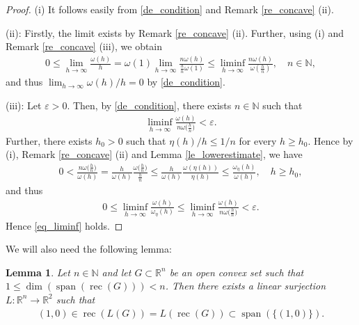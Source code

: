 \documentclass[10pt,a4paper]{amsart}
\newtheorem{lemma}[theorem]{Lemma}
\theoremstyle{definition}
\newcommand{\R}{\mathbb{R}}
\newcommand{\N}{\mathbb{N}}
\newcommand{\rec}{\operatorname{rec}}
\newcommand{\spann}{\operatorname{span}}
\begin{document}
\begin{proof}
(i) It follows easily from \eqref{de_condition} and Remark \ref{re_concave} (ii).

(ii): Firstly, the limit exists by Remark \ref{re_concave} (ii). Further, using (i) and Remark \ref{re_concave} (iii), we obtain
\begin{align*}
0\leq\lim_{h\to\infty}\frac{\omega(h)}{h}=\omega(1)\lim_{h\to\infty}\frac{n\omega(h)}{\frac{h}{n}\omega(1)}\leq\liminf_{h\to\infty}\frac{n\omega(h)}{\omega(\frac{h}{n})},\quad n\in\N,
\end{align*}
and thus $ \lim_{h\to\infty}\omega(h)/h=0 $ by \eqref{de_condition}.

(iii): Let $ \varepsilon>0 $. Then, by \eqref{de_condition}, there exists $ n\in\N $ such that
\begin{align*}
\liminf_{h\to\infty}\frac{\omega(h)}{n\omega\big(\frac{h}{n}\big)}<\varepsilon.
\end{align*}
Further, there exists $ h_0>0 $ such that $ \eta(h)/h\leq 1/n $ for every $ h\geq h_0 $. Hence by (i), Remark \ref{re_concave} (ii) and Lemma \ref{le_lowerestimate}, we have
\begin{align*}
0<\frac{n\omega\big(\frac{h}{n}\big)}{\omega(h)}=\frac{h}{\omega(h)}\frac{\omega\big(\frac{h}{n}\big)}{\frac{h}{n}}\leq\frac{h}{\omega(h)}\frac{\omega(\eta(h))}{\eta(h)}\leq\frac{\omega_{\eta}(h)}{\omega(h)},\quad h\geq h_0,
\end{align*}
and thus
\begin{align*}
0\leq\liminf_{h\to\infty}\frac{\omega(h)}{\omega_{\eta}(h)}\leq\liminf_{h\to\infty}\frac{\omega(h)}{n\omega\big(\frac{h}{n}\big)}<\varepsilon.
\end{align*}
Hence \eqref{eq_liminf} holds.
\end{proof}


We will also need the following lemma:

\begin{lemma}\label{le_projection}
Let $ n\in\N $ and let $ G\subset\R^n $ be an open convex set such that $ 1\leq\dim(\spann(\rec(G)))<n $. Then there exists a linear surjection $ L:\R^n\to\R^2 $ such that
\begin{align}\label{eq_projection}
(1,0)\in\rec(L(G))=L(\rec(G))\subset\spann(\lbrace (1,0)\rbrace).
\end{align}
\end{lemma}
\end{document}

